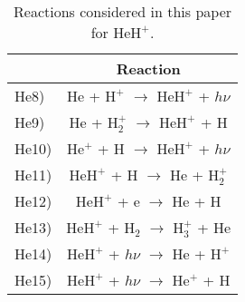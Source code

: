 \documentclass[baaa]{baaa}
\begin{document}
\begin{table}[h!]



\centering
\begin{tabular}{lc} 

\hline\hline\noalign{\smallskip}
&  Reaction \\
\hline\noalign{\smallskip}

He8) & $\mathrm{He}$ + $\mathrm{H^+}$ $\longrightarrow$ $\mathrm{HeH^+}$ + $h\nu$ \\



He9)& $\mathrm{He}$ + $\mathrm{H_2 ^+}$ $\longrightarrow$ $\mathrm{HeH^+}$ + $\mathrm{H}$ \\

He10)& $\mathrm{He^+}$ + $\mathrm{H}$ $\longrightarrow$ $\mathrm{HeH^+}$ + $h\nu$ \\

He11)& $\mathrm{HeH^+}$ + $\mathrm{H}$ $\longrightarrow$ $\mathrm{He}$ + $\mathrm{H_2 ^+}$ \\

He12)& $\mathrm{HeH^+}$ + e $\longrightarrow$ $\mathrm{He}$ + $\mathrm{H}$ \\
He13) & $\mathrm{HeH^+}$ + $\mathrm{H_2}$ $\longrightarrow$ $\mathrm{H_3^+}$ + $\mathrm{He}$ \\
He14)& $\mathrm{HeH^+}$ + $h\nu$ $\longrightarrow$ $\mathrm{He}$ + $\mathrm{H^+}$  \\

He15)& $\mathrm{HeH^+}$ + $h\nu$ $\longrightarrow$ $\mathrm{He^+}$ + $\mathrm{H}$  \\ \hline
    
    \end{tabular}
    \caption{Reactions considered in this paper for  $\mathrm{HeH^+}$.}
    \label{reacciones}
\end{table}
\end{document}
